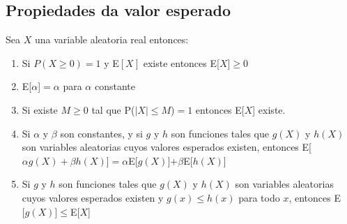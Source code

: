 \subsection{Propiedades da valor esperado}
\begin{Teo}
    Sea $X$ una variable aleatoria real entonces:
    \begin{enumerate}
        \item Si $P(X \geq 0) = 1$ y E$[X]$ existe entonces E[$X$]$\geq 0$
        \item E[$\alpha$]$= \alpha$ para $\alpha$ constante
        \item Si existe $M \geq 0$ tal que P($|X| \leq M$)$=1$ entonces E[$X$] existe. 
        \item Si $\alpha$ y $\beta$ son constantes, y si $g$ y $h$ son funciones tales que 
              $g(X)$ y $h(X)$ son variables aleatorias cuyos valores esperados existen, 
              entonces E[$\alpha g(X) + \beta h(X)$]$= \alpha$E[$g(X)$]$+ \beta$E[$h(X)$]
        \item Si $g$ y $h$ son funciones tales que $g(X)$ y $h(X)$ son variables aleatorias
              cuyos valores esperados existen y $g(x)\leq h(x)$ para todo $x$, entonces 
              E$[g(X)$]$\leq$E[$X$]  
    \end{enumerate}
\end{Teo}